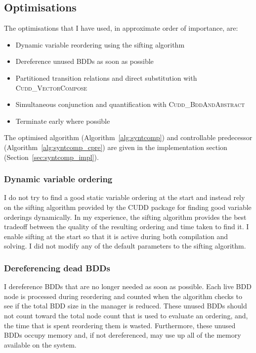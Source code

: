 \subsection{Optimisations}
\label{sec:syntcomp_optimisations}

The optimisations that I have used, in approximate order of importance, are:
\begin{itemize}
    \item Dynamic variable reordering using the sifting algorithm \cite{Rudell_1993}
    \item Dereference unused BDDs as soon as possible
    \item Partitioned transition relations \cite{Burch_91} and direct substitution with \textsc{Cudd\_VectorCompose}
    \item Simultaneous conjunction and quantification with \textsc{Cudd\_BddAndAbstract}
    \item Terminate early where possible
\end{itemize}

The optimised algorithm (Algorithm~\ref{alg:syntcomp}) and controllable predecessor (Algorithm~\ref{alg:syntcomp_cpre}) are given in the implementation section (Section~\ref{sec:syntcomp_impl}).

\subsubsection{Dynamic variable ordering}
I do not try to find a good static variable ordering at the start and instead rely on the sifting algorithm provided by the CUDD package for finding good variable orderings dynamically. In my experience, the sifting algorithm provides the best tradeoff between the quality of the resulting ordering and time taken to find it. I enable sifting at the start so that it is active during both compilation and solving. I did not modify any of the default parameters to the sifting algorithm.

\subsubsection{Dereferencing dead BDDs}
I dereference BDDs that are no longer needed as soon as possible. Each live BDD node is processed during reordering and counted when the algorithm checks to see if the total BDD size in the manager is reduced. These unused BDDs should not count toward the total node count that is used to evaluate an ordering, and, the time that is spent reordering them is wasted. Furthermore, these unused BDDs occupy memory and, if not dereferenced, may use up all of the memory available on the system.


